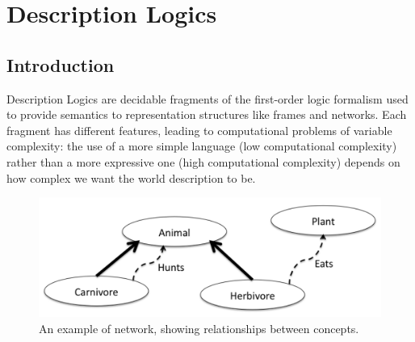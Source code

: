 \documentclass[a4paper, 11pt, oneside]{elsarticle}
\begin{document}


\newpage



\section{Description Logics}\label{dl}

\subsection{Introduction}
Description Logics are decidable fragments of the first-order logic formalism used to provide semantics to representation structures like frames and networks.
Each fragment has different features, leading to computational problems of variable complexity: the use of a more simple language (low computational complexity) rather than a more expressive one (high computational complexity) depends on how complex we want the world description to be.


\begin{figure}[htp]
\centering
\includegraphics[scale=.33]{img/relationship_network.png}
\caption{An example of network, showing relationships between concepts.}
\label{rel_net}
\end{figure}
\end{document}
